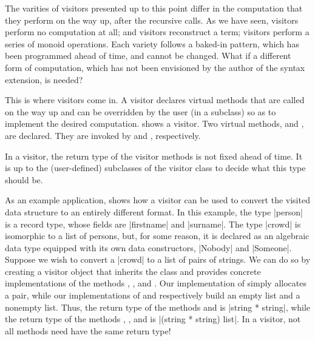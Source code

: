 \documentclass[11pt,a4paper,twoside]{article}
\begin{document}
The varities of visitors presented up to this point differ in the computation
that they perform on the way up, after the recursive calls. As we have seen,
\iter visitors perform no computation at all; \map and \mapendo visitors
reconstruct a term; \reduce visitors perform a series of monoid operations.
Each variety follows a baked-in pattern, which has been programmed ahead of
time, and cannot be changed. What if a different form of computation, which
has not been envisioned by the author of the \visitors syntax extension, is
needed?

This is where \fold visitors come in. A \fold visitor declares virtual methods
that are called on the way up and can be overridden by the user (in a
subclass) so as to implement the desired computation. 
shows a \fold visitor. Two virtual methods, 
and , are declared. They are invoked by
 and , respectively.

In a \fold visitor, the return type of the visitor methods is not fixed ahead
of time. It is up to the (user-defined) subclasses of the visitor class to
decide what this type should be.

As an example application,  shows how a \fold visitor can be
used to convert the visited data structure to an entirely different format. In
this example, the type \oc|person| is a record type, whose fields are
\oc|firstname| and \oc|surname|. The type \oc|crowd| is isomorphic to a list
of persons, but, for some reason, it is declared as an algebraic data type
equipped with its own data constructors, \oc|Nobody| and \oc|Someone|. Suppose
we wish to convert a \oc|crowd| to a list of pairs of strings. We can do so by
creating a visitor object that inherits the class \fold and provides concrete
implementations of the methods ,
, and .
Our implementation of  simply allocates
a pair, while our implementations of
 and 
respectively build an empty list and a nonempty list.
Thus, the return type of the methods 
and  is \oc|string * string|,
while the return type of the methods ,
, and  is
\oc|(string * string) list|. In a \fold visitor, not all methods
need have the same return type!
\end{document}
